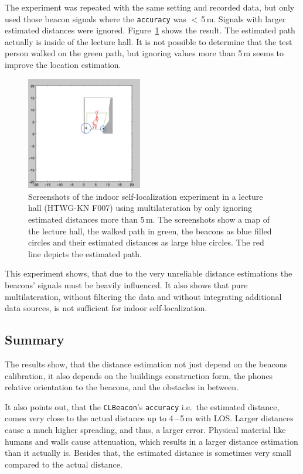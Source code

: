 The experiment was repeated with the same setting and recorded data, but only used those beacon signals where the \texttt{accuracy} was $<$\,5\,m. Signals with larger estimated distances were ignored. Figure~\ref{fig:beacon_eval_multilat_less5m} shows the result. The estimated path actually is inside of the lecture hall. It is not possible to determine that the test person walked on the green path, but ignoring values more than 5\,m seems to improve the location estimation.

\begin{figure}
	\includegraphics[width=0.45\textwidth]{figures/multilat_less5m}
	\caption{Screenshots of the indoor self-localization experiment in a lecture hall (HTWG-KN F007) using multilateration by only ignoring estimated distances more than 5\,m. The screenshots show a map of the lecture hall, the walked path in green, the beacons as blue filled circles and their estimated distances as large blue circles. The red line depicts the estimated path.}
	\label{fig:beacon_eval_multilat_less5m}
\end{figure}

This experiment shows, that due to the very unreliable distance estimations the beacons' signals must be heavily influenced. It also shows that pure multilateration, without filtering the data and without integrating additional data sources, is not sufficient for indoor self-localization.

\subsection{Summary}
The results show, that the distance estimation not just depend on the beacons calibration, it also depends on the buildings construction form, the phones relative orientation to the beacons, and the obstacles in between.

It also points out, that the \texttt{CLBeacon}'s \texttt{accuracy} i.e.\ the estimated distance, comes very close to the actual distance up to 4\,--\,5\,m with \acs{LOS}. Larger distances cause a much higher spreading, and thus, a larger error. Physical material like humans and walls cause attenuation, which results in a larger distance estimation than it actually is. Besides that, the estimated distance is sometimes very small compared to the actual distance.

